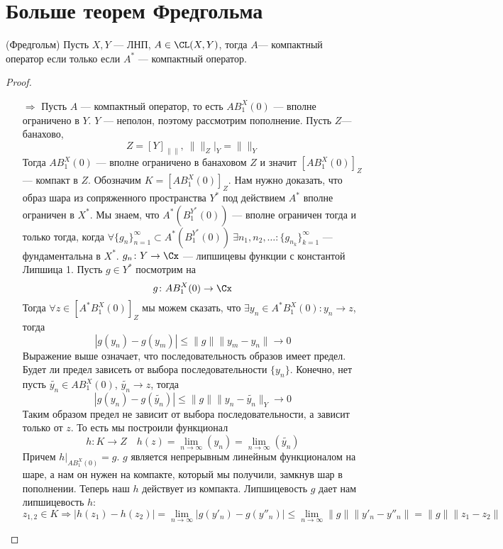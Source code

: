 \newpage
\section{Больше теорем Фредгольма}
\begin{theorem}(Фредгольм)
	Пусть $X,Y$ --- ЛНП, $A \in \CL(X, Y)$, тогда $ A $--- компактный оператор если только если $A^*$ --- компактный оператор. 
\end{theorem}
\begin{proof}
	\hfill
	\begin{enumerate}
		\item[$\Rightarrow$] Пусть $A$ --- компактный оператор, то есть $AB_1^X(0)$ --- вполне ограничено в $Y$. $Y$ --- неполон, поэтому рассмотрим пополнение. Пусть $Z$--- банахово, $$Z = [Y]_{\|\|}, \ \|\|_Z\big |_{Y} = \|\|_Y$$
		Тогда $AB_1^X(0)$ --- вполне ограничено в банаховом $Z$ и значит $[AB_1^X(0)]_Z$ --- компакт в $Z$. Обозначим $K =[AB_1^X(0)]_Z$. Нам нужно доказать, что образ шара из сопряженного пространства $Y^*$ под действием $A^*$ вполне ограничен в $X^*$. Мы знаем, что
		$
		A^*(B_1^{Y^*}(0))$ --- вполне ограничен тогда и только тогда, когда $\forall \{g_n\}_{n=1}^\infty \subset A^*(B_1^{Y^*}(0)) \ \exists n_1, n_2, \dots\colon \{g_{n_k}\}_{k=1}^\infty$ --- фундаментальна в $X^*$. $g_n\colon Y \to \Cx$ --- липшицевы функции с константой Липшица 1. Пусть $g \in Y^*$ посмотрим на 
		$$
		g \colon AB_1^X(0) \to \Cx
		$$
		Тогда $\forall z \in [A^*B_1^X(0)]_Z$ мы можем сказать, что $\exists y_n \in A^*B_1^X(0)\colon y_n \to z$, тогда
		$$
		|g(y_n) - g(y_m)| \leq \|g\| \|y_m - y_n\| \to 0
		$$
		Выражение выше означает, что последовательность образов имеет предел. Будет ли предел зависеть от выбора последовательности $\{y_n\}$. Конечно, нет пусть $\tilde{y_n} \in AB_1^X(0)$, $\tilde{y_n} \to z$, тогда
		$$
		|g(y_n) - g(\tilde{y_n})| \leq \|g\| \|y_n - \tilde{y_n}\|_Y \to 0 
		$$
		Таким образом предел не зависит от выбора последовательности, а зависит только от $z$. То есть мы построили функционал 
		$$
		h\colon K \to Z \quad h (z) = \lim\limits_{n \to \infty}(y_n) = \lim\limits_{n \to \infty}(\tilde{y_n})
		$$
		Причем $\displaystyle h \big |_{AB_1^X(0)} = g$. $g$ является непрерывным линейным функционалом на шаре, а нам он нужен на компакте, который мы получили, замкнув шар в пополнении. Теперь наш $h$ действует из компакта. Липшицевость $g$ дает нам липшицевость $h$:
		$$
		z_{1,2} \in K \Rightarrow |h(z_1)- h(z_2)| = \lim\limits_{n \to \infty}|g(y'_n) - g(y''_n)| \leq \lim\limits_{n \to \infty} \|g\| \|y'_n - y''_n\| = \|g\|\|z_1-z_2\|
		$$

\end{enumerate}
\end{proof}
